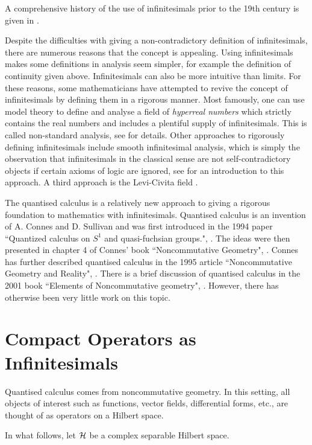 A comprehensive history of the use of infinitesimals prior to the 19th
century is given in \cite{infinitesimalBook}.

Despite the difficulties with giving a non-contradictory definition
of infinitesimals, there are numerous reasons that the concept is appealing. 
Using infinitesimals makes some definitions in analysis seem simpler, for example
the definition of continuity given above. Infinitesimals
can also be more intuitive than limits. For these reasons, some mathematicians
have attempted to revive the concept of infinitesimals
by defining them in a rigorous manner. Most famously, one can 
use model theory to define and analyse a field of \emph{hyperreal numbers}
which strictly contains the real numbers and includes a plentiful supply of infinitesimals.
This is called non-standard analysis, see \cite{robinson} for details.
Other approaches to rigorously defining infinitesimals include smooth infinitesimal
analysis, which is simply the observation that infinitesimals in the classical
sense are not self-contradictory objects if certain axioms of logic are ignored, see
\cite{sia} for an introduction to this approach.
A third approach is the Levi-Civita field \cite{lcf}.


The quantised calculus is a relatively new approach to giving
a rigorous foundation to mathematics with infinitesimals.
Quantised calculus is an invention of A.
Connes and D. Sullivan and was first introduced in the 1994 paper 
``Quantized calculus on $S^1$ and quasi-fuchsian groups.", \cite{connes1994quantized}. 
The ideas were then presented in chapter 4 of Connes' book ``Noncommutative Geometry",
\cite{Connes94}. Connes has further described quantised calculus in the 1995 article
``Noncommutative Geometry and Reality", \cite{connes1995noncommutative}.
There is a brief discussion of quantised calculus in the 2001 book ``Elements of Noncommutative
geometry", \cite{GVF01}. However, there has otherwise been very little work
on this topic.

\section{Compact Operators as Infinitesimals}
Quantised calculus
comes from noncommutative geometry. 
In this setting, all objects
of interest such as functions, vector fields, differential forms, etc., are
thought of as operators on a Hilbert space. 


In what follows, let $\mathcal{H}$ be a complex separable Hilbert space. 

